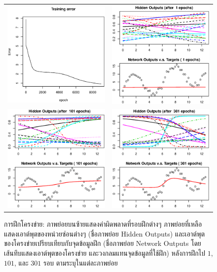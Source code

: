 \begin{figure}[htp]
  \centering
  \caption{การฝึกโครงข่าย: ภาพย่อยบนซ้ายแสดงค่าผิดพลาดที่รอบฝึกต่างๆ 
  ภาพย่อยที่เหลือแสดงเอาต์พุตของหน่วยซ่อนต่างๆ (ชื่อภาพย่อย Hidden Outputs) และเอาต์พุตของโครงข่ายเปรียบเทียบกับจุดข้อมูลฝึก (ชื่อภาพย่อย Network Outputs โดย เส้นทึบแสดงเอาต์พุตของโครงข่าย และวงกลมแทนจุดข้อมูลที่ใช้ฝึก)  หลังการฝึกไป $1$, $101$, และ $301$ รอบ ตามระบุในแต่ละภาพย่อย}
  \label{fig: ANN simple example training}
  \begin{tabular}{cc}
    \includegraphics[width=60mm]{04ANN/error9001.eps}&    
    \includegraphics[width=60mm]{04ANN/simpleN1.eps}     \\
    \includegraphics[width=60mm]{04ANN/simpleN101.eps}&
    \includegraphics[width=60mm]{04ANN/simpleN301.eps}\\    
  \end{tabular}
\end{figure}

